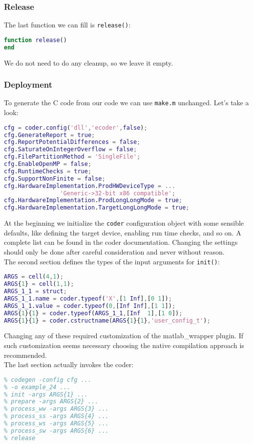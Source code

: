 \documentclass[11pt,a4paper,twoside]{article}
\newcommand{\+}{\discretionary{\mbox{\scriptsize$\hookleftarrow$}}{}{}}
\begin{document}
\subsubsection*{Release}
The last function we can fill is \texttt{release()}:
\begin{lstlisting}[language=Matlab]
function release()
end
\end{lstlisting}
We do not need to do any cleanup, so we leave it empty.
\subsubsection*{Deployment}
To generate the C code from our \Matlab{} code we can use \texttt{make.m}
unchanged. Let's take a look:
\begin{lstlisting}[language=Matlab]
%% Create configuration object of class 'coder.CodeConfig'.
cfg = coder.config('dll','ecoder',false);
cfg.GenerateReport = true;
cfg.ReportPotentialDifferences = false;
cfg.SaturateOnIntegerOverflow = false;
cfg.FilePartitionMethod = 'SingleFile';
cfg.EnableOpenMP = false;
cfg.RuntimeChecks = true;
cfg.SupportNonFinite = false;
cfg.HardwareImplementation.ProdHWDeviceType = ...
                'Generic->32-bit x86 compatible';
cfg.HardwareImplementation.ProdLongLongMode = true;
cfg.HardwareImplementation.TargetLongLongMode = true;
\end{lstlisting}
At the beginning we initialize the \texttt{coder} configuration object with some sensible
defaults, like defining the target device, enabling run time checks, and so on.
A complete list can be found in the \Matlab{} coder documentation. Changing the
settings should only be done after careful consideration and never without
reason. \\
The second section defines the types of the input arguments for \texttt{init()}:
\begin{lstlisting}[language=Matlab]
%% Define argument types for entry-point 'init'.
ARGS = cell(4,1);
ARGS{1} = cell(1,1);
ARGS_1_1 = struct;
ARGS_1_1.name = coder.typeof('X',[1 Inf],[0 1]);
ARGS_1_1.value = coder.typeof(0,[Inf Inf],[1 1]);
ARGS{1}{1} = coder.typeof(ARGS_1_1,[Inf  1],[1 0]);
ARGS{1}{1} = coder.cstructname(ARGS{1}{1},'user_config_t');
\end{lstlisting}
Changing any of these required customization of the matlab\_wrapper plugin. If
such customization seems necessary choosing the native compilation approach is
recommended. \\
The last section actually invokes the \Matlab{} coder:
\begin{lstlisting}[language=Matlab]
%% Example coder invocation. Remove the unneeded callbacks
% codegen -config cfg ...
% -o example_24 ...
% init -args ARGS{1} ...
% prepare -args ARGS{2} ...
% process_ww -args ARGS{3} ...
% process_ss -args ARGS{4} ...
% process_ws -args ARGS{5} ...
% process_sw -args ARGS{6} ...
% release
\end{lstlisting}
\end{document}
